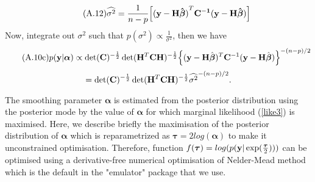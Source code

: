 \documentclass[12pt,titlepage]{report}
\newcommand{\bH}{{\bf H}}
\newcommand{\bC}{{\bf C}}
\newcommand{\by}{{\bf y}}
\newcommand{\hbbeta}{{\hat{\boldsymbol{\beta}}}}
\newcommand{\btau}{{{\boldsymbol{\tau}}}}
\theoremstyle{definition}
\theoremstyle{remark}
\begin{document}
\begin{equation}\tag{A.12}
\widehat{\sigma^2}=\frac{1}{n-p}\Big[\mathbf{(y-H\hat{\boldsymbol \beta})}^T\bf C^{-1}(\bf y-H\hat{\boldsymbol \beta})\Big]
\end{equation}
Now, integrate out $\sigma^2$ such that $p(\sigma^2) \propto \frac{1}{\sigma^2}$, then we have
\begin{equation}\tag{A.10c}\label{like3}
p(\by|\boldsymbol{\alpha})\propto \det(\bC)^{-\frac{1}{2}}\det(\bH^T\bC\bH)^{-\frac{1}{2}} \Big \{(\by-\bH\hbbeta)^T \bC^{-1}(\by-\bH\hbbeta)\Big\}^{-(n-p)/2}
\end{equation}
$$=\det(\bC)^{-\frac{1}{2}}\det(\bH^T\bC\bH)^{-\frac{1}{2}} {\widehat{\sigma^2}}^{-(n-p)/2}.$$


The smoothing parameter $\boldsymbol{\alpha}$ is estimated from the posterior distribution using the posterior mode by the value of $\boldsymbol{\alpha}$ for which marginal likelihood (\ref{like3}) is maximised. Here, we describe briefly the maximisation of the posterior distribution of $\boldsymbol{\alpha}$ which is reparametrized as $\btau=2log(\boldsymbol{\alpha})$ to make it unconstrained optimisation. 
Therefore, function $f(\btau)=log(p(\by|\exp(\frac{\btau}{2})))$ can be optimised using a derivative-free numerical optimisation of Nelder-Mead method which is the default in the "emulator" package that we use.
\end{document}

